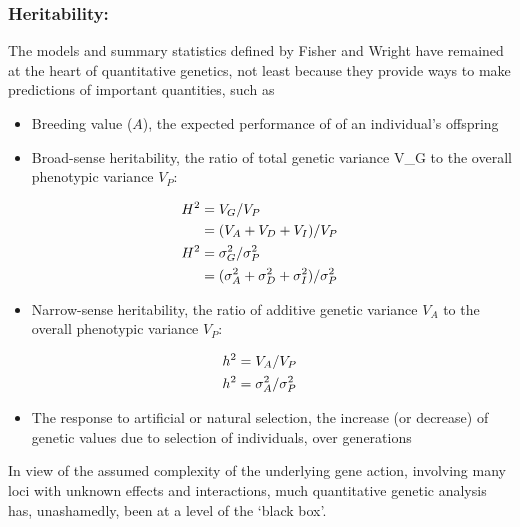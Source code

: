 \documentclass[
]{book}
\providecommand{\tightlist}{%
  \setlength{\itemsep}{0pt}\setlength{\parskip}{0pt}}
\begin{document}
\hypertarget{heritability}{%
\subsubsection{Heritability:}\label{heritability}}

The models and summary statistics defined by Fisher and Wright have remained at the heart of quantitative genetics, not least because they provide ways to make predictions of important quantities, such as

\begin{itemize}
\tightlist
\item
  Breeding value (\(A\)), the expected performance of of an individual's offspring
\item
  Broad-sense heritability, the ratio of total genetic variance V\_G to the overall phenotypic variance \(V_{P}\):
\end{itemize}

\begin{align}
H^2 &= V_{G}/V_P \notag \\
    &= (V_{A} + V_{D} + V_{I})/V_P  \notag \\
H^2 &= \sigma^2_{G}/\sigma^2_P  \notag \\
    &= (\sigma^2_{A} + \sigma^2_{D} + \sigma^2_{I})/\sigma^2_P  \notag 
\end{align}

\begin{itemize}
\tightlist
\item
  Narrow-sense heritability, the ratio of additive genetic variance \(V_{A}\) to the overall phenotypic variance \(V_{P}\):
\end{itemize}

\begin{align}
h^2 &= V_{A}/V_P  \notag \\
h^2 &= \sigma^2_{A}/\sigma^2_P
\end{align}

\begin{itemize}
\tightlist
\item
  The response to artificial or natural selection, the increase (or decrease) of genetic values due to selection of individuals, over generations
\end{itemize}

In view of the assumed complexity of the underlying gene action, involving many loci with unknown effects and interactions, much quantitative genetic analysis has, unashamedly, been at a level of the `black box'.
\end{document}
